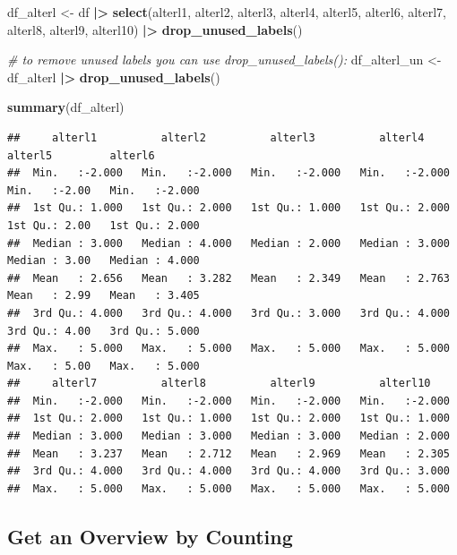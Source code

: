 \documentclass[
  doc]{apa6}
\newenvironment{Shaded}{\begin{snugshade}}{\end{snugshade}}
\newcommand{\CommentTok}[1]{\textcolor[rgb]{0.56,0.35,0.01}{\textit{#1}}}
\newcommand{\FunctionTok}[1]{\textcolor[rgb]{0.13,0.29,0.53}{\textbf{#1}}}
\newcommand{\NormalTok}[1]{#1}
\newcommand{\OtherTok}[1]{\textcolor[rgb]{0.56,0.35,0.01}{#1}}
\newcommand{\SpecialCharTok}[1]{\textcolor[rgb]{0.81,0.36,0.00}{\textbf{#1}}}
\begin{document}
\begin{Shaded}
\begin{Highlighting}[]
\NormalTok{df\_alterl }\OtherTok{\textless{}{-}}\NormalTok{ df }\SpecialCharTok{|\textgreater{}} 
  \FunctionTok{select}\NormalTok{(alterl1, }
\NormalTok{         alterl2, }
\NormalTok{         alterl3, }
\NormalTok{         alterl4, }
\NormalTok{         alterl5, }
\NormalTok{         alterl6, }
\NormalTok{         alterl7, }
\NormalTok{         alterl8, }
\NormalTok{         alterl9, }
\NormalTok{         alterl10) }\SpecialCharTok{|\textgreater{}} 
  \FunctionTok{drop\_unused\_labels}\NormalTok{() }

\CommentTok{\# to remove unused labels you can use drop\_unused\_labels():}
\NormalTok{df\_alterl\_un }\OtherTok{\textless{}{-}}\NormalTok{ df\_alterl }\SpecialCharTok{|\textgreater{}}
  \FunctionTok{drop\_unused\_labels}\NormalTok{()}



\FunctionTok{summary}\NormalTok{(df\_alterl)}
\end{Highlighting}
\end{Shaded}

\begin{verbatim}
##     alterl1          alterl2          alterl3          alterl4          alterl5         alterl6      
##  Min.   :-2.000   Min.   :-2.000   Min.   :-2.000   Min.   :-2.000   Min.   :-2.00   Min.   :-2.000  
##  1st Qu.: 1.000   1st Qu.: 2.000   1st Qu.: 1.000   1st Qu.: 2.000   1st Qu.: 2.00   1st Qu.: 2.000  
##  Median : 3.000   Median : 4.000   Median : 2.000   Median : 3.000   Median : 3.00   Median : 4.000  
##  Mean   : 2.656   Mean   : 3.282   Mean   : 2.349   Mean   : 2.763   Mean   : 2.99   Mean   : 3.405  
##  3rd Qu.: 4.000   3rd Qu.: 4.000   3rd Qu.: 3.000   3rd Qu.: 4.000   3rd Qu.: 4.00   3rd Qu.: 5.000  
##  Max.   : 5.000   Max.   : 5.000   Max.   : 5.000   Max.   : 5.000   Max.   : 5.00   Max.   : 5.000  
##     alterl7          alterl8          alterl9          alterl10     
##  Min.   :-2.000   Min.   :-2.000   Min.   :-2.000   Min.   :-2.000  
##  1st Qu.: 2.000   1st Qu.: 1.000   1st Qu.: 2.000   1st Qu.: 1.000  
##  Median : 3.000   Median : 3.000   Median : 3.000   Median : 2.000  
##  Mean   : 3.237   Mean   : 2.712   Mean   : 2.969   Mean   : 2.305  
##  3rd Qu.: 4.000   3rd Qu.: 4.000   3rd Qu.: 4.000   3rd Qu.: 3.000  
##  Max.   : 5.000   Max.   : 5.000   Max.   : 5.000   Max.   : 5.000
\end{verbatim}

\hypertarget{get-an-overview-by-counting}{%
\subsection{Get an Overview by Counting}\label{get-an-overview-by-counting}}
\end{document}
